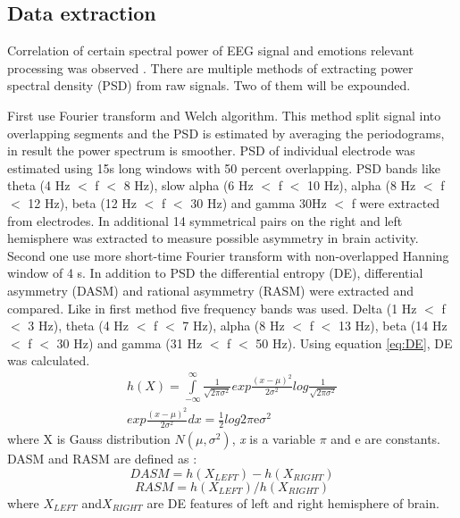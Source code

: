 \documentclass[10pt,journal,compsoc,twoside]{IEEEtran}
\newcommand{\Ref}[2]{#2 \ref{#1}}
\newcommand{\fromto}[5]{(#1 #3 $<$ #4 $<$ #2 #3)}
\newcommand{\me}{\mathrm{e}}
\begin{document}
\subsection{Data extraction}
Correlation of certain spectral power of EEG signal and emotions relevant processing was observed \cite{AftanasSavotinaMakhnev2005}. There are multiple methods of extracting power spectral density (PSD) from raw signals. Two of them will be expounded.

First \cite{WeiLongBoNanBaoLiang2014} use Fourier transform and Welch algorithm. This method split signal into overlapping segments and the PSD is estimated by averaging the periodograms, in result the power spectrum is smoother. PSD of individual electrode was estimated using 15s long windows with 50 percent overlapping. PSD bands like theta \fromto{4}{8}{Hz}{f} \  ,  slow alpha \fromto{6}{10}{Hz}{f} \  ,  alpha \fromto{8}{12}{Hz}{f} \  ,  beta \fromto{12}{30}{Hz}{f} \\  and  gamma 30Hz $<$ f were extracted from electrodes. In additional 14 symmetrical pairs on the right and left hemisphere was extracted to measure possible asymmetry in brain activity.
\newline
\newline
Second one use more short-time Fourier transform with non-overlapped Hanning window of 4 s. In addition to PSD the differential entropy (DE), differential asymmetry (DASM) and rational asymmetry (RASM) were extracted and compared. Like in first method five frequency bands was used. Delta \fromto{1}{3}{Hz}{f} \  ,  theta \fromto{4}{7}{Hz}{f} \  ,  alpha \fromto{8}{13}{Hz}{f} \  ,  beta \fromto{14}{30}{Hz}{f} \\ and  gamma \fromto{31}{50}{Hz}{f} \,. Using \Ref{eq:DE}{equation}, DE was calculated.
\begin{equation}
\begin{aligned}
h(X)=\int\limits_{-\infty}^{\infty} \frac{1}{\sqrt{2\pi\sigma^{2}}}exp \frac{(x - \mu)^{2}}{2\sigma^{2}}log\frac{1}{\sqrt{2\pi\sigma^{2}}}\\ exp\frac{(x - \mu)^{2}}{2\sigma^{2}}dx = \frac{1}{2}log2\pi \me \sigma^{2}
\end{aligned}
\label{eq:DE}
\end{equation}
where X is Gauss distribution $N(\mu, \sigma^2)$, \textit{x} is a variable $\pi$ and $\me$ are constants. DASM and RASM are defined as :
\begin{equation}
DASM = h(X_{LEFT}) - h(X_{RIGHT})
\end{equation}
\begin{equation}
RASM = h(X_{LEFT}) / h(X_{RIGHT})
\end{equation}
where $X_{LEFT}$ and$X_{RIGHT}$ are DE features of left and right hemisphere of brain.
\newpage
\end{document}
